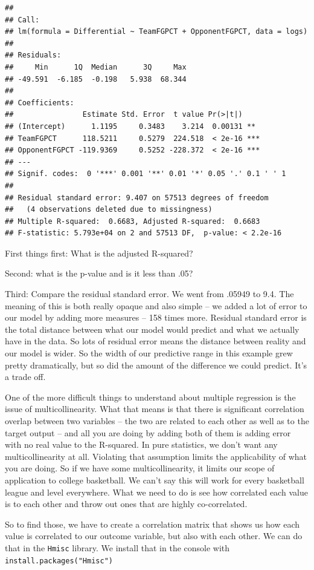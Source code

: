\documentclass[
]{book}
\begin{document}
\begin{verbatim}
## 
## Call:
## lm(formula = Differential ~ TeamFGPCT + OpponentFGPCT, data = logs)
## 
## Residuals:
##     Min      1Q  Median      3Q     Max 
## -49.591  -6.185  -0.198   5.938  68.344 
## 
## Coefficients:
##                Estimate Std. Error  t value Pr(>|t|)    
## (Intercept)      1.1195     0.3483    3.214  0.00131 ** 
## TeamFGPCT      118.5211     0.5279  224.518  < 2e-16 ***
## OpponentFGPCT -119.9369     0.5252 -228.372  < 2e-16 ***
## ---
## Signif. codes:  0 '***' 0.001 '**' 0.01 '*' 0.05 '.' 0.1 ' ' 1
## 
## Residual standard error: 9.407 on 57513 degrees of freedom
##   (4 observations deleted due to missingness)
## Multiple R-squared:  0.6683, Adjusted R-squared:  0.6683 
## F-statistic: 5.793e+04 on 2 and 57513 DF,  p-value: < 2.2e-16
\end{verbatim}

First things first: What is the adjusted R-squared?

Second: what is the p-value and is it less than .05?

Third: Compare the residual standard error. We went from .05949 to 9.4. The meaning of this is both really opaque and also simple -- we added a lot of error to our model by adding more measures -- 158 times more. Residual standard error is the total distance between what our model would predict and what we actually have in the data. So lots of residual error means the distance between reality and our model is wider. So the width of our predictive range in this example grew pretty dramatically, but so did the amount of the difference we could predict. It's a trade off.

One of the more difficult things to understand about multiple regression is the issue of multicollinearity. What that means is that there is significant correlation overlap between two variables -- the two are related to each other as well as to the target output -- and all you are doing by adding both of them is adding error with no real value to the R-squared. In pure statistics, we don't want any multicollinearity at all. Violating that assumption limits the applicability of what you are doing. So if we have some multicollinearity, it limits our scope of application to college basketball. We can't say this will work for every basketball league and level everywhere. What we need to do is see how correlated each value is to each other and throw out ones that are highly co-correlated.

So to find those, we have to create a correlation matrix that shows us how each value is correlated to our outcome variable, but also with each other. We can do that in the \texttt{Hmisc} library. We install that in the console with \texttt{install.packages("Hmisc")}
\end{document}
